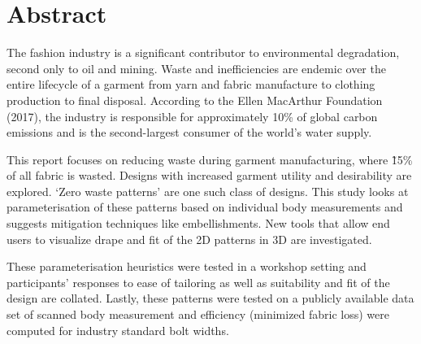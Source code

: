 \chapter*{Abstract}

The fashion industry is a significant contributor to environmental degradation, second only to oil and mining. Waste and inefficiencies are endemic over the entire lifecycle of a garment from yarn and fabric manufacture to clothing production to final disposal. According to the Ellen MacArthur Foundation (2017), the industry is responsible for approximately 10\% of global carbon emissions and is the second-largest consumer of the world’s water supply.

This report focuses on reducing waste during garment manufacturing, where \~15\% of all fabric is wasted. Designs with increased garment utility and desirability are explored. ‘Zero waste patterns’ are one such class of designs. This study looks at parameterisation of these patterns based on individual body measurements and suggests mitigation techniques like embellishments. New tools that allow end users to visualize drape and fit of the 2D patterns in 3D are investigated.

These parameterisation heuristics were tested in a workshop setting and participants’ responses to ease of tailoring as well as suitability and fit of the design are collated. Lastly, these patterns were tested on a publicly available data set of scanned body measurement and efficiency (minimized fabric loss) were computed for industry standard bolt widths. 
